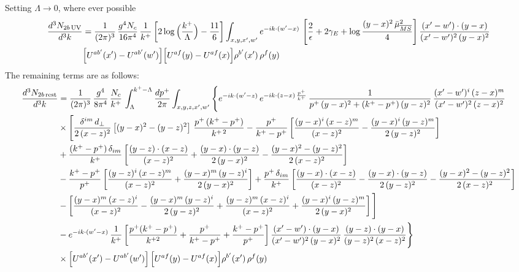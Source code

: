\documentclass[9pt]{article}
\numberwithin{equation}{section}
\begin{document}
Setting $\Lambda\to 0$, where ever possible
\begin{align}
\frac{d^{3}N_{2b\,\rm UV}}{d^{3}k}&=\frac{1}{(2\pi)^{3}}\,\frac{g^{4}N_{c}}{16\pi^{4}}\,\frac{1}{k^{+}}\left[2\log\Big(\frac{k^{+}}{\Lambda}\Big)-\frac{11}{6}\right]\int_{x,y,x',w'}e^{-ik\cdot(w'-x)}\,\left[\frac{2}{\epsilon}+2\gamma_{E}+\log\frac{(y-x)^{2}\,\bar\mu^{2}_{\overline{MS}}}{4}\right]\frac{(x'-w')\cdot(y-x)}{(x'-w')^{2}\,(y-x)^{2}}\notag \\ & \Big[U^{ab'}(x')-U^{ab'}(w')\Big]\Big[U^{af}(y)-U^{af}(x)\Big]\rho^{b'}(x')\,\rho^{f}(y)
\end{align}
The remaining terms are as follows: 
\begin{align}
\frac{d^{3}N_{2b\,\rm rest}}{d^{3}k}&=\frac{1}{(2\pi)^{3}}\,\frac{g^{4}}{8\pi^{4}}\,\frac{N_{c}}{k^{+}}\,\int_{\Lambda}^{k^{+}-\Lambda}\frac{dp^{+}}{2\pi}\int_{x,y,z,x',w'}\Bigg\{e^{-ik\cdot(w'-z)}\,e^{-ik\cdot(z-x)\,\frac{p^{+}}{k^{+}}}\,\frac{1}{p^{+}\,(y-x)^{2}+(k^{+}-p^{+})\,(y-z)^{2}}\,\frac{(x'-w')^{i}\,(z-x)^{m}}{(x'-w')^{2}\,(z-x)^{2}}\notag\\
&\times\Bigg[\frac{\delta^{im}\,d_{\perp}}{2\,(x-z)^{2}}\left[(y-x)^{2}-(y-z)^{2}\right]\,\frac{p^{+}\,(k^{+}-p^{+})}{k^{+\,2}}-\frac{p^{+}}{k^{+}-p^{+}}\left[\frac{(y-x)^{i}\,(x-z)^{m}}{(x-z)^{2}}-\frac{(y-x)^{i}\,(y-z)^{m}}{2\,(y-z)^{2}}\right]\notag\\
&+\frac{(k^{+}-p^{+})\,\delta_{im}}{k^{+}}\left[\frac{(y-z)\cdot(x-z)}{(x-z)^{2}}+\frac{(y-x)\cdot(y-z)}{2\,(y-x)^{2}}-\frac{(y-x)^{2}-(y-z)^{2}}{2\,(x-z)^{2}}\right]
\notag \\ & -\frac{k^{+}-p^{+}}{p^{+}}\left[\frac{(y-z)^{i}\,(x-z)^{m}}{(x-z)^{2}}+\frac{(y-x)^{m}\,(y-z)^{i}}{2\,(y-x)^{2}}\right]+\frac{p^{+}\,\delta_{im}}{k^{+}}\left[\frac{(y-x)\cdot(x-z)}{(x-z)^{2}}-\frac{(y-x)\cdot(y-z)}{2\,(y-z)^{2}}-\frac{(y-x)^{2}-(y-z)^{2}}{2\,(x-z)^{2}}\right]\notag\\
&-\left[\frac{(y-x)^{m}\,(x-z)^{i}}{(x-z)^{2}}-\frac{(y-x)^{m}\,(y-z)^{i}}{2\,(y-z)^{2}}+\frac{(y-z)^{m}\,(x-z)^{i}}{(x-z)^{2}}+\frac{(y-x)^{i}\,(y-z)^{m}}{2\,(y-x)^{2}}\right]\Bigg]\notag\\
&-e^{-ik\cdot(w'-x)}\,\frac{1}{k^{+}}\left[\frac{p^{+}(k^{+}-p^{+})}{k^{+2}}+\frac{p^{+}}{k^{+}-p^{+}}+\frac{k^{+}-p^{+}}{p^{+}}\right]\frac{(x'-w')\cdot(y-x)}{(x'-w')^{2}\,(y-x)^{2}}\,\frac{(y-z)\cdot(y-x)}{(y-z)^{2}\,(x-z)^{2}}\Bigg\}\notag\\
&\times\Big[U^{ab'}(x')-U^{ab'}(w')\Big]\,\Big[U^{af}(y)-U^{af}(x)\Big]\rho^{b'}(x')\,\rho^{f}(y)
\end{align}
\end{document}
